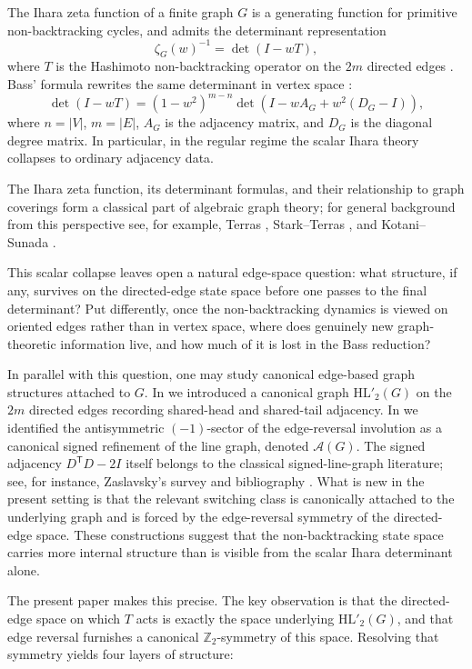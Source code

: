 \documentclass[11pt]{article}
\begin{document}
The Ihara zeta function of a finite graph $G$ is a generating function for primitive non-backtracking cycles, and admits the determinant representation \cite{Ihara1966,Hashimoto1989}
\[
\zeta_G(w)^{-1}=\det(I-wT),
\]
where $T$ is the Hashimoto non-backtracking operator on the $2m$ directed edges \cite{Hashimoto1989}. Bass' formula rewrites the same determinant in vertex space \cite{Bass1992}:
\[
\det(I-wT)=(1-w^2)^{m-n}\det(I-wA_G+w^2(D_G-I)),
\]
where $n=|V|$, $m=|E|$, $A_G$ is the adjacency matrix, and $D_G$ is the diagonal degree matrix. In particular, in the regular regime the scalar Ihara theory collapses to ordinary adjacency data.

The Ihara zeta function, its determinant formulas, and their relationship to graph coverings form a classical part of algebraic graph theory; for general background from this perspective see, for example, Terras \cite{TerrasBook}, Stark--Terras \cite{StarkTerras1996}, and Kotani--Sunada \cite{KotaniSunada2000}.

This scalar collapse leaves open a natural edge-space question: what structure, if any, survives on the directed-edge state space before one passes to the final determinant? Put differently, once the non-backtracking dynamics is viewed on oriented edges rather than in vertex space, where does genuinely new graph-theoretic information live, and how much of it is lost in the Bass reduction?

In parallel with this question, one may study canonical edge-based graph structures attached to \(G\). In \cite{BalHL2} we introduced a canonical graph \(\mathrm{HL}'_2(G)\) on the \(2m\) directed edges recording shared-head and shared-tail adjacency. In \cite{BalALG} we identified the antisymmetric \((-1)\)-sector of the edge-reversal involution as a canonical signed refinement of the line graph, denoted \(\mathcal A(G)\). The signed adjacency \(D^{\mathsf T}D-2I\) itself belongs to the classical signed-line-graph literature; see, for instance, Zaslavsky’s survey and bibliography \cite{ZaslavskySGG,ZaslavskyBiblio}. What is new in the present setting is that the relevant switching class is canonically attached to the underlying graph and is forced by the edge-reversal symmetry of the directed-edge space. These constructions suggest that the non-backtracking state space carries more internal structure than is visible from the scalar Ihara determinant alone.

The present paper makes this precise. The key observation is that the directed-edge space on which \(T\) acts is exactly the space underlying \(\mathrm{HL}'_2(G)\), and that edge reversal furnishes a canonical \(\mathbb Z_2\)-symmetry of this space. Resolving that symmetry yields four layers of structure:
\end{document}
